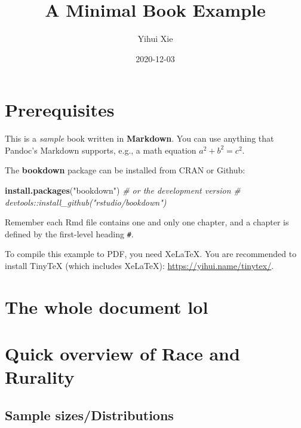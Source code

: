 \documentclass[
]{book}
\title{A Minimal Book Example}
\author{Yihui Xie}
\date{2020-12-03}
\newenvironment{Shaded}{\begin{snugshade}}{\end{snugshade}}
\newcommand{\CommentTok}[1]{\textcolor[rgb]{0.56,0.35,0.01}{\textit{#1}}}
\newcommand{\KeywordTok}[1]{\textcolor[rgb]{0.13,0.29,0.53}{\textbf{#1}}}
\newcommand{\NormalTok}[1]{#1}
\newcommand{\StringTok}[1]{\textcolor[rgb]{0.31,0.60,0.02}{#1}}
\begin{document}
\maketitle

{
\setcounter{tocdepth}{1}
\tableofcontents
}
\hypertarget{prerequisites}{%
\chapter{Prerequisites}\label{prerequisites}}

This is a \emph{sample} book written in \textbf{Markdown}. You can use anything that Pandoc's Markdown supports, e.g., a math equation \(a^2 + b^2 = c^2\).

The \textbf{bookdown} package can be installed from CRAN or Github:

\begin{Shaded}
\begin{Highlighting}[]
\KeywordTok{install.packages}\NormalTok{(}\StringTok{"bookdown"}\NormalTok{)}
\CommentTok{# or the development version}
\CommentTok{# devtools::install_github("rstudio/bookdown")}
\end{Highlighting}
\end{Shaded}

Remember each Rmd file contains one and only one chapter, and a chapter is defined by the first-level heading \texttt{\#}.

To compile this example to PDF, you need XeLaTeX. You are recommended to install TinyTeX (which includes XeLaTeX): \url{https://yihui.name/tinytex/}.

\hypertarget{the-whole-document-lol}{%
\chapter{The whole document lol}\label{the-whole-document-lol}}

\hypertarget{quick-overview-of-race-and-rurality}{%
\chapter{Quick overview of Race and Rurality}\label{quick-overview-of-race-and-rurality}}

\hypertarget{sample-sizesdistributions}{%
\section{Sample sizes/Distributions}\label{sample-sizesdistributions}}
\end{document}
